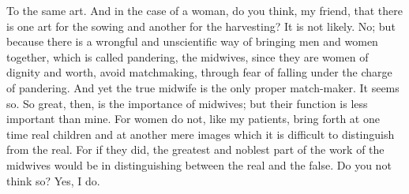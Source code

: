 \documentclass[letterpaper,12pt]{article}
\newcommand{\stephpag}[1]{\marginnote{\small\itshape\fontfamily{ppl}\selectfont #1}}
\begin{document}
\begin{drama}
\theaetetusspeaks
To the same art.
\socratesspeaks
And in the case of a woman, do you think, my friend, that there is one art for the sowing and another for the harvesting?
\theaetetusspeaks
It is not likely. \stephpag{150 a}
\socratesspeaks
No; but because there is a wrongful and unscientific way of bringing men and women together, which is called pandering, the midwives, since they are women of dignity and worth, avoid matchmaking, through fear of falling under the charge of pandering. And yet the true midwife is the only proper match-maker.
\theaetetusspeaks
It seems so.
\socratesspeaks
So great, then, is the importance of midwives; but their function is less important than mine. For women do not, like my patients, bring forth \stephpag{b} at one time real children and at another mere images which it is difficult to distinguish from the real. For if they did, the greatest and noblest part of the work of the midwives would be in distinguishing between the real and the false. Do you not think so?
\theaetetusspeaks
Yes, I do.
\socratesspeaks

\end{drama}
\end{document}
